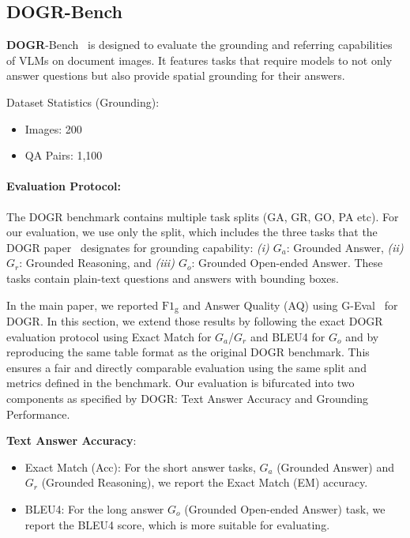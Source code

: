 \subsection{DOGR-Bench}
\label{sec:dataset_dogr}

\textbf{DOGR}-Bench~\cite{zhou2025dogr} is  designed to evaluate the grounding and referring  capabilities of VLMs on document images. It features tasks that require models to not only answer questions but also provide spatial grounding for their answers.

\noindent Dataset Statistics (Grounding): 
\begin{itemize}
    \item Images: 200
    \item QA Pairs: 1,100
\end{itemize}


\paragraph{Evaluation Protocol:} The DOGR benchmark contains multiple task splits (GA, GR, GO, PA etc).  For our evaluation, we use only the split, which includes the three tasks that the DOGR paper~\cite{zhou2025dogr} designates for grounding capability: 
\textit{(i) $G_a$}: Grounded Answer,
\textit{(ii) $G_r$}: Grounded Reasoning, and
\textit{(iii) $G_o$}: Grounded Open-ended Answer.
These tasks contain plain-text questions and answers with bounding boxes.

\noindent In the main paper, we reported $\text{F1}_{\text{g}}$ and Answer Quality (AQ) using G-Eval~\cite{liu2023geval} for DOGR. 
In this section, we extend those results by following the exact DOGR evaluation protocol using Exact Match for $G_a$/$G_r$ and BLEU4 for $G_o$ and by reproducing the same table format as the original DOGR benchmark. 
This ensures a fair and directly comparable evaluation using the same split and metrics defined in the benchmark. Our evaluation is bifurcated into two components as specified by DOGR: Text Answer Accuracy and Grounding Performance.

\noindent \textbf{Text Answer Accuracy}:



\begin{itemize}
    \item Exact Match (Acc): For the short answer tasks, $G_a$ (Grounded Answer) and $G_r$ (Grounded Reasoning), we report the Exact Match (EM) accuracy.
    \item BLEU4: For the long answer $G_o$ (Grounded Open-ended Answer) task, we report the BLEU4 score, which is more suitable for evaluating.
\end{itemize}



